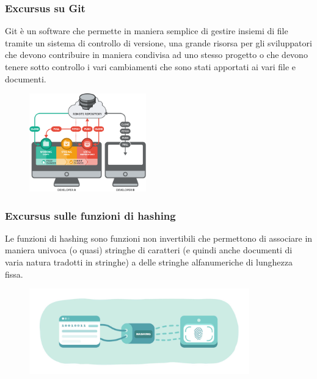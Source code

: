 \documentclass{beamer}
\begin{document}
\begin{frame}
	\frametitle{Excursus su Git}
	Git è un software che permette in maniera semplice di gestire insiemi di file tramite un sistema di controllo di versione, una grande risorsa per gli sviluppatori che devono contribuire in maniera condivisa ad uno stesso progetto o che devono tenere sotto controllo i vari cambiamenti che sono stati apportati ai vari file e documenti.
	\begin{figure}
		\includegraphics[width=0.45\textwidth]{figures/git2.png}
	\end{figure}
\end{frame}
\begin{frame}
	\frametitle{Excursus sulle funzioni di hashing}
	Le funzioni di hashing sono funzioni non invertibili che permettono di associare in maniera univoca (o quasi) stringhe di caratteri (e quindi anche documenti di varia natura tradotti in stringhe) a delle stringhe alfanumeriche di lunghezza fissa.
	\bigskip
	\begin{figure}
		\includegraphics[width=0.85\textwidth]{figures/hashing.jpg}
	\end{figure}
\end{frame}
\end{document}
